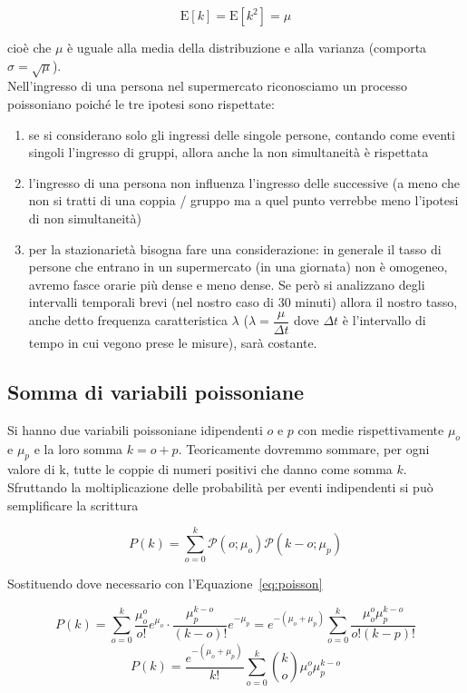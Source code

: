 \documentclass[a4paper,12pt]{article}
\begin{document}
\[ \mathrm{E}[k] = \mathrm{E}[k^2] = \mu \]

cioè che $\mu$ è uguale alla media della distribuzione e alla varianza (comporta $\sigma = \sqrt{\mu}$).\\
Nell'ingresso di una persona nel supermercato riconosciamo un processo poissoniano poiché le tre ipotesi sono rispettate: 

\begin{enumerate}
    \item se si considerano solo gli ingressi delle singole persone, contando come eventi singoli l'ingresso di gruppi, allora anche la non simultaneità è rispettata
    \item l'ingresso di una persona non influenza l'ingresso delle successive (a meno  che non si tratti di una coppia / gruppo ma a quel punto verrebbe meno l'ipotesi di non simultaneità)
    \item per la stazionarietà bisogna fare una considerazione: in generale il tasso di persone che entrano in un supermercato (in una giornata) non è omogeneo, avremo fasce orarie più dense e meno dense. Se però si analizzano degli intervalli temporali brevi (nel nostro caso di 30 minuti) allora il nostro tasso, anche detto frequenza caratteristica $\lambda$ ($\lambda = \dfrac{\mu}{\Delta t}$ dove $\Delta t$ è l'intervallo di tempo in cui vegono prese le misure), sarà costante.
\end{enumerate}

\subsection{Somma di variabili poissoniane}\label{sec:somma_di_poiss}

Si hanno due variabili poissoniane idipendenti $o$ e $p$ con medie rispettivamente $\mu_o$ e $\mu_p$ e la loro somma $k = o + p$. Teoricamente dovremmo sommare, per ogni valore di k, tutte le coppie di numeri positivi che danno come somma $k$. Sfruttando la moltiplicazione delle probabilità per eventi indipendenti si può semplificare la scrittura

\[ P(k) = \sum_{o=0}^{k}\mathcal{P} (o;\mu_o)\mathcal{P} (k-o;\mu_p) \]

Sostituendo dove necessario con l'Equazione~\ref{eq:poisson}

\[ P(k) = \sum_{o=0}^{k} \dfrac{\mu_{o}^{o}}{o!} e^{\mu_o} \cdot \dfrac{\mu_{p}^{k-o}}{(k-o)!} e^{-\mu_p} = e^{-(\mu_o+\mu_p)} \sum_{o=0}^{k}\dfrac{\mu_{o}^{o} \mu_{p}^{k-o}}{o!(k-p)!} \]
\[ P(k) = \dfrac{e^{-(\mu_o+\mu_p)}}{k!}\sum_{o=0}^{k}\binom{k}{o}\mu_{o}^{o}\mu_{p}^{k-o}\]
\end{document}
